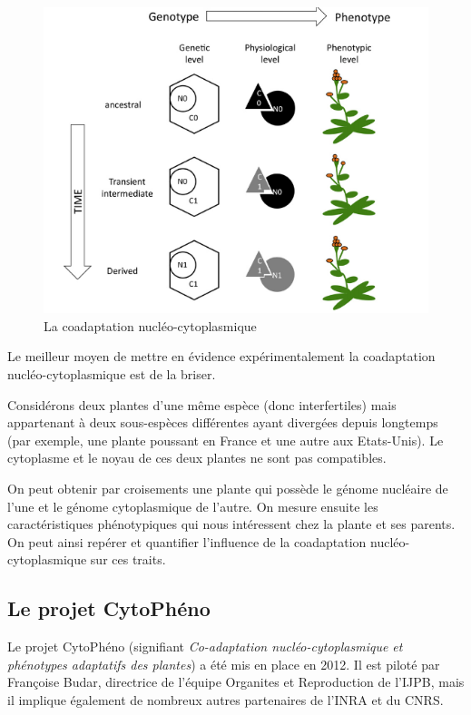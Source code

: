 \documentclass[a4paper]{article}
\begin{document}
\begin{figure}[H]
\centering
\includegraphics[scale=0.8]{Introduction/coadaptation.PNG}
\caption{La coadaptation nucléo-cytoplasmique \cite{marechal2012mitochondrial}}
\label{coadaptation}
\end{figure}

Le meilleur moyen de mettre en évidence expérimentalement la coadaptation nucléo-cytoplasmique est de la briser.

Considérons deux plantes d'une même espèce (donc interfertiles) mais appartenant à deux sous-espèces différentes ayant divergées depuis longtemps (par exemple, une plante poussant en France et une autre aux Etats-Unis). Le cytoplasme et le noyau de ces deux plantes ne sont pas compatibles. 

On peut obtenir par croisements une plante qui possède le génome nucléaire de l'une et le génome cytoplasmique de l'autre. On mesure ensuite les caractéristiques phénotypiques qui nous intéressent chez la plante et ses parents. On peut ainsi repérer et quantifier l'influence de la coadaptation nucléo-cytoplasmique sur ces traits. 

\subsection{Le projet CytoPhéno}

Le projet CytoPhéno (signifiant \textit{Co-adaptation nucléo-cytoplasmique et phénotypes adaptatifs des plantes}) a été mis en place en 2012. Il est piloté par Françoise Budar, directrice de l'équipe Organites et Reproduction de l'IJPB, mais il implique également de nombreux autres partenaires de l'INRA et du CNRS. 
\end{document}
